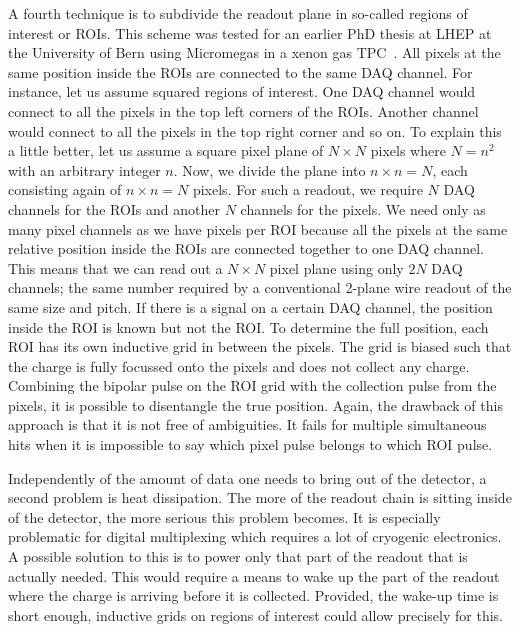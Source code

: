 A fourth technique is to subdivide the readout plane in so-called regions of interest or ROIs.
This scheme was tested for an earlier PhD thesis at LHEP at the University of Bern using Micromegas in a xenon gas TPC~\cite{mapelsyrup}.
All pixels at the same position inside the ROIs are connected to the same DAQ channel.
For instance, let us assume squared regions of interest.
One DAQ channel would connect to all the pixels in the top left corners of the ROIs.
Another channel would connect to all the pixels in the top right corner and so on.
To explain this a little better, let us assume a square pixel plane of $N \times N$ pixels where $N = n ^ 2$ with an arbitrary integer $n$.
Now, we divide the plane into $n \times n = N$, each consisting again of $n \times n = N$ pixels.
For such a readout, we require $N$ DAQ channels for the ROIs and another $N$ channels for the pixels.
We need only as many pixel channels as we have pixels per ROI because all the pixels at the same relative position inside the ROIs are connected together to one DAQ channel.
This means that we can read out a $N \times N$ pixel plane using only $2 N$ DAQ channels; the same number required by a conventional 2-plane wire readout of the same size and pitch.
If there is a signal on a certain DAQ channel, the position inside the ROI is known but not the ROI.
To determine the full position, each ROI has its own inductive grid in between the pixels.
The grid is biased such that the charge is fully focussed onto the pixels and does not collect any charge.
Combining the bipolar pulse on the ROI grid with the collection pulse from the pixels, it is possible to disentangle the true position.
Again, the drawback of this approach is that it is not free of ambiguities.
It fails for multiple simultaneous hits when it is impossible to say which pixel pulse belongs to which ROI pulse.

Independently of the amount of data one needs to bring out of the detector, a second problem is heat dissipation.
The more of the readout chain is sitting inside of the detector, the more serious this problem becomes.
It is especially problematic for digital multiplexing which requires a lot of cryogenic electronics.
A possible solution to this is to power only that part of the readout that is actually needed.
This would require a means to wake up the part of the readout where the charge is arriving before it is collected.
Provided, the wake-up time is short enough, inductive grids on regions of interest could allow precisely for this.

